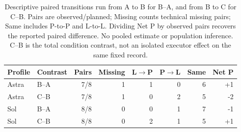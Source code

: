\begin{table}[htbp]
\centering\small
\begin{tabular}{llrrrrrr}\toprule
Profile & Contrast & Pairs & Missing & L$\to$P & P$\to$L & Same & Net P\\\midrule
Astra & B--A & 7/8 & 1 & 1 & 0 & 6 & +1\\
Astra & C--B & 7/8 & 1 & 0 & 2 & 5 & -2\\
Sol & B--A & 8/8 & 0 & 0 & 1 & 7 & -1\\
Sol & C--B & 8/8 & 0 & 2 & 1 & 5 & +1\\
\bottomrule
\end{tabular}
\caption{Descriptive paired transitions run from A to B for B--A, and from B to C for C--B. Pairs are observed/planned; Missing counts technical missing pairs; Same includes P-to-P and L-to-L. Dividing Net P by observed pairs recovers the reported paired difference. No pooled estimate or population inference. C--B is the total condition contrast, not an isolated executor effect on the same fixed record.}
\label{tab:followup-pairs}
\end{table}
